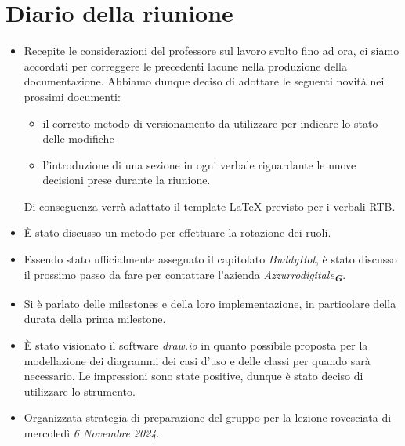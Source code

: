 

\section{Diario della riunione}

\begin{itemize}
    \item Recepite le considerazioni del professore sul lavoro svolto fino ad ora, ci siamo accordati per correggere le precedenti lacune nella 
    produzione della documentazione. Abbiamo dunque deciso di adottare le seguenti novità nei prossimi documenti:
    \begin{itemize}
        \item il corretto metodo di versionamento da utilizzare per indicare lo stato delle modifiche
        \item l'introduzione di una sezione in ogni verbale riguardante le nuove decisioni prese durante la riunione.
    \end{itemize}
    Di conseguenza verrà adattato il template LaTeX previsto per i verbali RTB.
    \item È stato discusso un metodo per effettuare la rotazione dei ruoli.
    \item Essendo stato ufficialmente assegnato il capitolato \emph{BuddyBot}, è stato discusso il prossimo passo da fare per contattare l'azienda 
    \emph{Azzurrodigitale}\textsubscript{\textit{\textbf{G}}}.
    \item Si è parlato delle milestones e della loro implementazione, in particolare della durata della prima milestone.
    \item È stato visionato il software \emph{draw.io} in quanto possibile proposta per la modellazione dei diagrammi dei casi d'uso e delle classi 
    per quando sarà necessario. Le impressioni sono state positive, dunque è stato deciso di utilizzare lo strumento.
    \item Organizzata strategia di preparazione del gruppo per la lezione rovesciata di mercoledì \emph{6 Novembre 2024}.
\end{itemize}